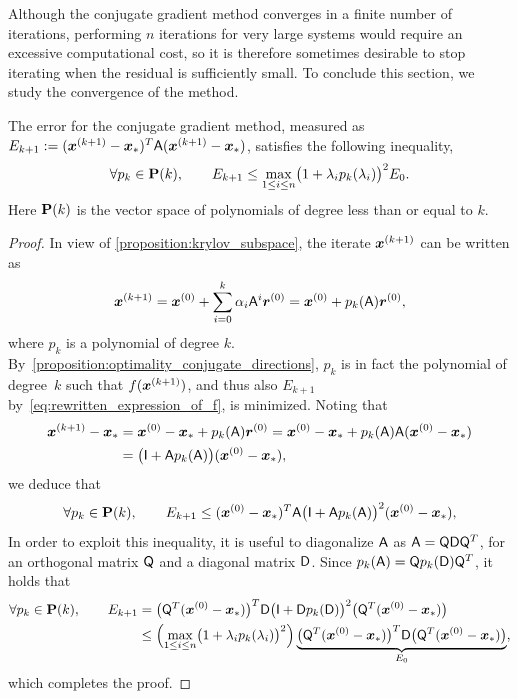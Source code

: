 Although the conjugate gradient method converges in a finite number of iterations,
performing $n$ iterations for very large systems  would require an excessive computational cost,
so it is therefore sometimes desirable to stop iterating when the residual is sufficiently small.
To conclude this section, we study the convergence of the method.
\begin{theorem}
    The error for the conjugate gradient method,
    measured as $E_{k+1} := (\mathbf{\boldsymbol{x}}^{(k+1)} - \mathbf{\boldsymbol{x}}_*)^T  \mathsf A (\mathbf{\boldsymbol{x}}^{(k+1)} - \mathbf{\boldsymbol{x}}_*)$,
    satisfies the following inequality,
    \[
        \forall p_k \in \mathbf P(k), \qquad
        E_{k+1} \leq  \max_{1\leq i \leq n}\bigl(1 + \lambda_i p_k(\lambda_i) \bigr)^2   E_0.
    \]
    Here $\mathbf P(k)$ is the vector space of polynomials of degree less than or equal to $k$.
\end{theorem}
\begin{proof}

In view of \cref{proposition:krylov_subspace},
the iterate $\mathbf{\boldsymbol{x}}^{(k+1)}$ can be written as
\[
    \mathbf{\boldsymbol{x}}^{(k+1)} = \mathbf{\boldsymbol{x}}^{(0)} + \sum_{i=0}^{k} \alpha_i \mathsf A^i \mathbf{\boldsymbol{r}}^{(0)}
    = \mathbf{\boldsymbol{x}}^{(0)} + p_k(\mathsf A) \mathbf{\boldsymbol{r}}^{(0)},
\]
where $p_k$ is a polynomial of degree $k$.
By~\cref{proposition:optimality_conjugate_directions},
$p_k$ is in fact the polynomial of degree~$k$ such that $f(\mathbf{\boldsymbol{x}}^{(k+1)})$,
and thus also $E_{k+1}$ by~\eqref{eq:rewritten_expression_of_f},
is minimized.
Noting that
\begin{align*}
    \mathbf{\boldsymbol{x}}^{(k+1)} - \mathbf{\boldsymbol{x}}_*
    &= \mathbf{\boldsymbol{x}}^{(0)}  - \mathbf{\boldsymbol{x}}_* + p_k(\mathsf A) \mathbf{\boldsymbol{r}}^{(0)}
    = \mathbf{\boldsymbol{x}}^{(0)}  - \mathbf{\boldsymbol{x}}_* + p_k(\mathsf A) \mathsf A (\mathbf{\boldsymbol{x}}^{(0)} - \mathbf{\boldsymbol{x}}_*) \\
    &= \bigl(\mathsf I + \mathsf A p_k(\mathsf A) \bigr) (\mathbf{\boldsymbol{x}}^{(0)} - \mathbf{\boldsymbol{x}}_*),
\end{align*}
we deduce that
\[
    \forall p_k \in \mathbf P(k), \qquad
    E_{k+1} \leq (\mathbf{\boldsymbol{x}}^{(0)} - \mathbf{\boldsymbol{x}}_*)^T \mathsf A \bigl(\mathsf I + \mathsf A p_k(\mathsf A) \bigr)^2  (\mathbf{\boldsymbol{x}}^{(0)} - \mathbf{\boldsymbol{x}}_*),
\]
In order to exploit this inequality,
it is useful to diagonalize $\mathsf A$ as $\mathsf A = \mathsf Q \mathsf D \mathsf Q^T$,
for an orthogonal matrix $\mathsf Q$ and a diagonal matrix $\mathsf D$.
Since $p_k(\mathsf A) = \mathsf Q p_k(\mathsf D) \mathsf Q^T$,
it holds that
\begin{align*}
    \forall p_k \in \mathbf P(k), \qquad
    E_{k+1}
    &= \bigl(\mathsf Q^T (\mathbf{\boldsymbol{x}}^{(0)} - \mathbf{\boldsymbol{x}}_*)\bigr)^T \mathsf D \bigl(\mathsf I + \mathsf D p_k(\mathsf D) \bigr)^2  \bigl(\mathsf Q^T (\mathbf{\boldsymbol{x}}^{(0)} - \mathbf{\boldsymbol{x}}_*)\bigr) \\
    &\leq \Bigl( \max_{1\leq i \leq n}\bigl(1 + \lambda_i p_k(\lambda_i) \bigr)^2 \Bigr)  \underbrace{\bigl(\mathsf Q^T (\mathbf{\boldsymbol{x}}^{(0)} - \mathbf{\boldsymbol{x}}_*)\bigr)^T \mathsf D   \bigl(\mathsf Q^T (\mathbf{\boldsymbol{x}}^{(0)} - \mathbf{\boldsymbol{x}}_*)\bigr)}_{E_0},
\end{align*}
which completes the proof.
\end{proof}


